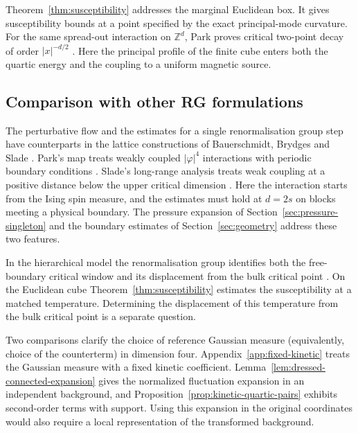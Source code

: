 \documentclass[11pt]{article}
\theoremstyle{definition}
\begin{document}
Theorem~\ref{thm:susceptibility} addresses the marginal Euclidean box.
It gives susceptibility bounds at a point specified by the exact
principal-mode curvature. For the same spread-out interaction on
\(\mathbb Z^d\), Park proves critical two-point decay of order
\(\lvert x\rvert^{-d/2}\) \cite[Theorem~1]{IsingCorrelation}.
Here the principal profile of the finite cube enters both the quartic
energy and the coupling to a uniform magnetic source.

\subsection{Comparison with other RG formulations}\label{sec:status}

The perturbative flow and the estimates for a single renormalisation
group step have counterparts in the lattice constructions of
Bauerschmidt, Brydges and Slade \cite{BauerschmidtBrydgesSlade2014}.
Park's map treats weakly coupled \(\lvert\varphi\rvert^4\)
interactions with periodic boundary conditions \cite{RGMap}.
Slade's long-range analysis treats weak coupling at a positive distance
below the upper critical dimension \cite{SladeLR}. Here the interaction
starts from the Ising spin measure, and the estimates must hold at
\(d=2s\) on blocks meeting a physical boundary. The pressure expansion
of Section~\ref{sec:pressure-singleton} and the boundary estimates of
Section~\ref{sec:geometry} address these two features.

In the hierarchical model the renormalisation group identifies both the
free-boundary critical window and its displacement from the bulk
critical point \cite{HierarchicalFBC}. On the Euclidean cube
Theorem~\ref{thm:susceptibility} estimates the susceptibility at a
matched temperature. Determining the displacement of this temperature
from the bulk critical point is a separate question.

Two comparisons clarify the choice of reference Gaussian measure 
(equivalently, choice of the counterterm) in dimension four.
Appendix~\ref{app:fixed-kinetic} treats the Gaussian measure 
with a fixed kinetic coefficient.
Lemma~\ref{lem:dressed-connected-expansion} gives the normalized
fluctuation expansion in an independent background, and
Proposition~\ref{prop:kinetic-quartic-pairs} exhibits second-order
terms with support. Using this expansion in the
original coordinates would also require a local representation of the
transformed background. 
\end{document}
